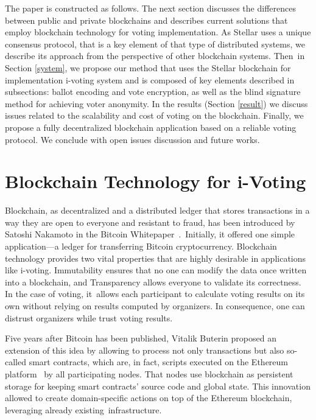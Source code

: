\documentclass[applsci,article,accept,moreauthors,pdftex]{Definitions/mdpi}
\begin{document}
The paper is constructed as follows. The next section discusses the differences between public and private blockchains and describes current solutions that employ blockchain technology for voting implementation.
As Stellar uses a unique consensus protocol, that is a key element of that type of distributed systems, we describe its approach from the perspective of other blockchain systems.  
Then~in Section \ref{system}, we propose our method that uses the Stellar blockchain for implementation i-voting system and is composed of key elements described in subsections: ballot encoding and vote encryption, as well as the blind signature method for achieving voter anonymity. 
In the results (Section \ref{result}) we discuss issues related to the scalability and cost of voting on the blockchain. Finally, we propose a fully decentralized blockchain application based on a reliable voting protocol. We conclude with open issues discussion and future works. 


\section{Blockchain Technology for i-Voting}%

Blockchain, as decentralized and a distributed ledger that stores
transactions in a way they are open to everyone and resistant to fraud, has been introduced by Satoshi Nakamoto in the Bitcoin Whitepaper~\cite{nakamoto2008bitcoin}.~Initially, it offered one simple application––a ledger for transferring Bitcoin cryptocurrency. 
Blockchain technology provides two vital properties that are highly desirable in applications like i-voting. Immutability ensures that no one can modify the data once written into a blockchain, and Transparency allows everyone to validate its correctness. In the case of voting, it~allows each participant to calculate voting results on its own without relying on results computed by organizers. 
In consequence, one can distrust organizers while trust voting results. 

Five years after Bitcoin has been published, Vitalik Buterin proposed an extension of this idea by allowing to process not only transactions but also so-called smart contracts, which are, in fact, scripts executed on the Ethereum platform~\cite{buterin2013ethereum} by all participating nodes. That nodes use blockchain as persistent storage for keeping smart contracts' source code and global state. This innovation allowed to create domain-specific actions on top of the Ethereum blockchain, leveraging already existing~infrastructure.
\end{document}
